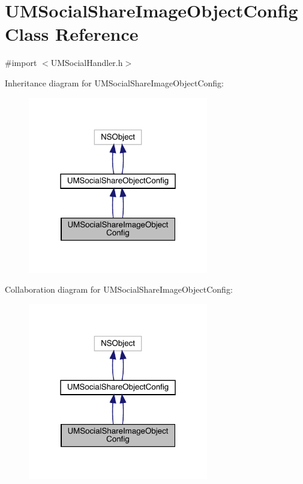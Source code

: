 \hypertarget{interface_u_m_social_share_image_object_config}{}\section{U\+M\+Social\+Share\+Image\+Object\+Config Class Reference}
\label{interface_u_m_social_share_image_object_config}


{\ttfamily \#import $<$U\+M\+Social\+Handler.\+h$>$}



Inheritance diagram for U\+M\+Social\+Share\+Image\+Object\+Config\+:\nopagebreak
\begin{figure}[H]
\begin{center}
\leavevmode
\includegraphics[width=223pt]{interface_u_m_social_share_image_object_config__inherit__graph}
\end{center}
\end{figure}


Collaboration diagram for U\+M\+Social\+Share\+Image\+Object\+Config\+:\nopagebreak
\begin{figure}[H]
\begin{center}
\leavevmode
\includegraphics[width=223pt]{interface_u_m_social_share_image_object_config__coll__graph}
\end{center}
\end{figure}
